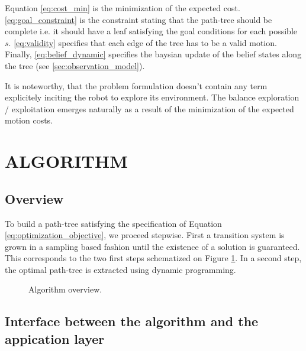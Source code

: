 \documentclass[letterpaper, 10 pt, conference]{ieeeconf}  %
\begin{document}
Equation \ref{eq:cost_min} is the minimization of the expected cost. \ref{eq:goal_constraint} is the constraint stating that the path-tree should be complete i.e. it should have a leaf satisfying the goal conditions for each possible $s$. \ref{eq:validity} specifies that each edge of the tree has to be a valid motion. Finally, \ref{eq:belief_dynamic} specifies the baysian update of the belief states along the tree (see \ref{sec:observation_model}).

It is noteworthy, that the problem formulation doesn't contain any term explicitely inciting the robot to explore its environment. The balance exploration / exploitation emerges naturally as a result of the minimization of the expected motion costs.
\section{ALGORITHM}

\subsection{Overview}

To build a path-tree satisfying the specification of Equation \ref{eq:optimization_objective}, we proceed stepwise. First a transition system is grown in a sampling based fashion until the existence of a solution is guaranteed. This corresponds to the two first steps schematized on Figure \ref{algorithm_overview}. In a second step, the optimal path-tree is extracted using dynamic programming. 

\begin{figure}[!htb]
\scriptsize
{}
 \caption{Algorithm overview.}
 \label{algorithm_overview}
\end{figure}

\subsection{Interface between the algorithm and the appication layer}
\end{document}
